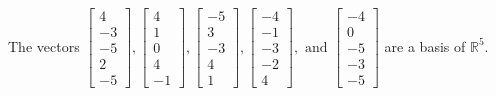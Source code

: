 \begin{exercise}
\begin{exerciseStatement}
  \end{exerciseStatement}
  \begin{exerciseAnswer}
   The vectors \(\left[\begin{array}{r}
4 \\
-3 \\
-5 \\
2 \\
-5
\end{array}\right] , \left[\begin{array}{r}
4 \\
1 \\
0 \\
4 \\
-1
\end{array}\right] , \left[\begin{array}{r}
-5 \\
3 \\
-3 \\
4 \\
1
\end{array}\right] , \left[\begin{array}{r}
-4 \\
-1 \\
-3 \\
-2 \\
4
\end{array}\right] , \text{ and } \left[\begin{array}{r}
-4 \\
0 \\
-5 \\
-3 \\
-5
\end{array}\right]\) 
  	 are  a basis of \(\mathbb{R}^5\).
  


  \end{exerciseAnswer}
\end{exercise}